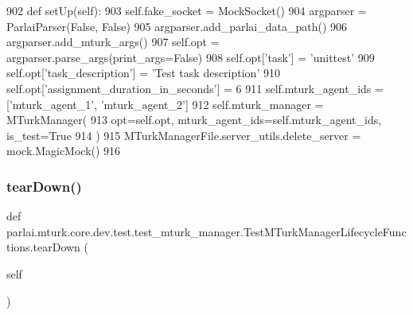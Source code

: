 \begin{DoxyCode}
902     \textcolor{keyword}{def }setUp(self):
903         self.fake\_socket = MockSocket()
904         argparser = ParlaiParser(\textcolor{keyword}{False}, \textcolor{keyword}{False})
905         argparser.add\_parlai\_data\_path()
906         argparser.add\_mturk\_args()
907         self.opt = argparser.parse\_args(print\_args=\textcolor{keyword}{False})
908         self.opt[\textcolor{stringliteral}{'task'}] = \textcolor{stringliteral}{'unittest'}
909         self.opt[\textcolor{stringliteral}{'task\_description'}] = \textcolor{stringliteral}{'Test task description'}
910         self.opt[\textcolor{stringliteral}{'assignment\_duration\_in\_seconds'}] = 6
911         self.mturk\_agent\_ids = [\textcolor{stringliteral}{'mturk\_agent\_1'}, \textcolor{stringliteral}{'mturk\_agent\_2'}]
912         self.mturk\_manager = MTurkManager(
913             opt=self.opt, mturk\_agent\_ids=self.mturk\_agent\_ids, is\_test=\textcolor{keyword}{True}
914         )
915         MTurkManagerFile.server\_utils.delete\_server = mock.MagicMock()
916 
\end{DoxyCode}
\mbox{\label{classparlai_1_1mturk_1_1core_1_1dev_1_1test_1_1test__mturk__manager_1_1TestMTurkManagerLifecycleFunctions_ace4806b37df5bc022c7b33061d580746}} 
\subsubsection{\texorpdfstring{tear\+Down()}{tearDown()}}
{\footnotesize\ttfamily def parlai.\+mturk.\+core.\+dev.\+test.\+test\+\_\+mturk\+\_\+manager.\+Test\+M\+Turk\+Manager\+Lifecycle\+Functions.\+tear\+Down (\begin{DoxyParamCaption}\item[{}]{self }\end{DoxyParamCaption})}



